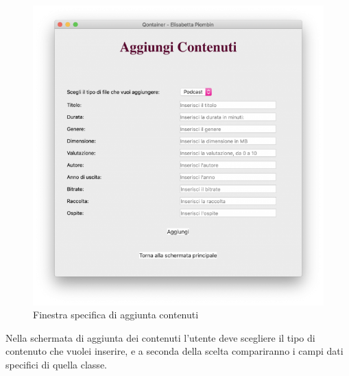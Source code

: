 \documentclass[a4paper,10pt]{article}
\begin{document}
\begin{figure}[H]
	\begin{center}
		\includegraphics[width=\textwidth,keepaspectratio]{immagini/AggiungiContenuti2.png}
	\end{center}
	\caption{\label{fig:my-label} Finestra specifica di aggiunta contenuti}
\end{figure}
Nella schermata di aggiunta dei contenuti l'utente deve scegliere il tipo di contenuto che vuolei inserire, e a seconda della scelta compariranno i campi dati specifici di quella classe.
\end{document}
